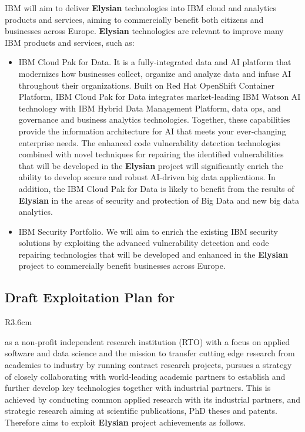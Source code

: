 \documentclass[a4paper,11pt]{article}
\newcommand{\project}[1]{\textbf{#1}\xspace}
\newcommand{\SECURITY}{\project{Elysian}}
\newcommand{\TheProject}{\SECURITY}
\begin{document}
IBM will aim to deliver \TheProject technologies into IBM cloud and analytics products and services, aiming to commercially benefit both citizens and businesses across Europe. \TheProject technologies are relevant to improve many IBM products and services, such as:
\begin{itemize}
    \item IBM Cloud Pak for Data. It is a fully-integrated data and AI platform that modernizes how businesses collect, organize and analyze data and infuse AI throughout their organizations. Built on Red Hat OpenShift Container Platform, IBM Cloud Pak for Data integrates market-leading IBM Watson AI technology with IBM Hybrid Data Management Platform, data ops, and governance and business analytics technologies. Together, these capabilities provide the information architecture for AI that meets your ever-changing enterprise needs. The enhanced code vulnerability detection technologies combined with novel techniques for repairing the identified vulnerabilities that will be developed in the \TheProject project will significantly enrich the ability to develop secure and robust AI-driven big data applications. In addition, the IBM Cloud Pak for Data is likely to benefit from the results of \TheProject in the areas of security and protection of Big Data and new big data analytics.
    \item IBM Security Portfolio. We will aim to enrich the existing IBM security solutions by exploiting the advanced vulnerability detection and code repairing technologies that will be developed and enhanced in the \TheProject project to commercially benefit businesses across Europe.
\end{itemize}

\horizontalline

\subsection*{Draft Exploitation Plan for \SCCHshort{}}
\vspace{-6pt}

\begin{wrapfigure}{R}{3.6cm}
\vspace{-1.3cm}
\hfill {}
\vspace{-0.8cm}
\end{wrapfigure}


\SCCHlong{} as a non-profit independent research institution (RTO) with a focus on applied software and data science and the mission to transfer cutting edge research from academics to industry by running contract research projects, pursues a strategy of closely collaborating with world-leading academic partners to establish and further develop key technologies together with industrial partners. This is achieved by conducting common applied research with its industrial partners, and strategic research aiming at scientific publications, PhD theses and patents. Therefore \SCCHshort{} aims to exploit  \TheProject{} project achievements as follows.
\end{document}
